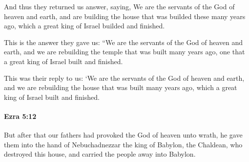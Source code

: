 			\begin{versebox}
					\item[BHS] 
					\item[LXX] 
					\item[ASV] And thus they returned us answer, saying, We are the servants of the God of heaven and earth, and are building the house that was builded these many years ago, which a great king of Israel builded and finished.
					\item[NIV] This is the answer they gave us: “We are the servants of the God of heaven and earth, and we are rebuilding the temple that was built many years ago, one that a great king of Israel built and finished.
					\item[NRSV] This was their reply to us: ‘We are the servants of the God of heaven and earth, and we are rebuilding the house that was built many years ago, which a great king of Israel built and finished.
			\end{versebox}

		\paragraph{Ezra 5:12} %
			\label{EZRA-5-12}

			But after that our fathers had provoked the God of heaven unto wrath, he gave them into the hand of Nebuchadnezzar the king of Babylon, the Chaldean, who destroyed this house, and carried the people away into Babylon.

